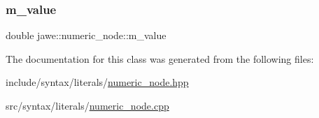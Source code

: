 \subsubsection{\texorpdfstring{m\+\_\+value}{m\_value}}
{\footnotesize\ttfamily double jawe\+::numeric\+\_\+node\+::m\+\_\+value\hspace{0.3cm}{\ttfamily [private]}}



The documentation for this class was generated from the following files\+:\begin{DoxyCompactItemize}
\item 
include/syntax/literals/\hyperlink{numeric__node_8hpp}{numeric\+\_\+node.\+hpp}\item 
src/syntax/literals/\hyperlink{numeric__node_8cpp}{numeric\+\_\+node.\+cpp}\end{DoxyCompactItemize}
